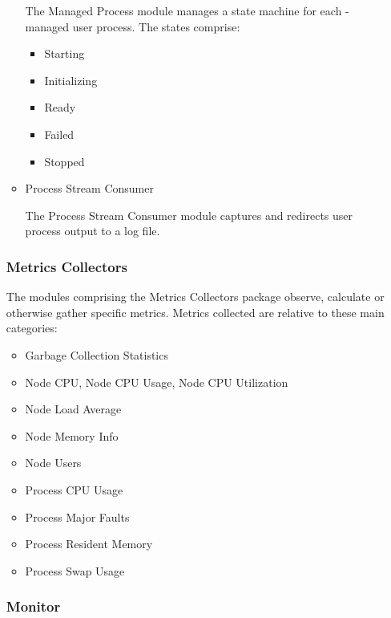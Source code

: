 \begin{itemize}
\begin{itemize}
      The Managed Process module manages a state machine for each
      \varAgent-managed user process.  The states comprise:
      
         \begin{itemize}
           \item Starting
           \item Initializing
           \item Ready
           \item Failed
           \item Stopped
         \end{itemize}
         
      \item Process Stream Consumer
      
      The Process Stream Consumer module captures and redirects user process output
      to a log file.
      
    \end{itemize}  
    
    \subsubsection{Metrics Collectors} 
    
    The modules comprising the Metrics Collectors package observe, calculate
    or otherwise gather specific metrics. Metrics collected are relative to
    these main categories:
        
    \begin{itemize}
      \item Garbage Collection Statistics
      \item Node CPU, Node CPU Usage, Node CPU Utilization
      \item Node Load Average
      \item Node Memory Info
      \item Node Users
      \item Process CPU Usage
      \item Process Major Faults
      \item Process Resident Memory
      \item Process Swap Usage
    \end{itemize}  
    
    \subsubsection{Monitor} 


\end{itemize}
